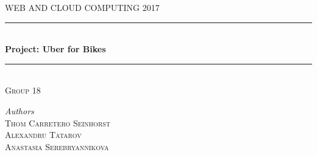 \begin{titlepage} %
	\newcommand{\HRule}{\rule{\linewidth}{0.5mm}} %
	
	\center %
	
	
	\textsc{\LARGE WEB AND CLOUD COMPUTING 2017}\\[1.5cm] %
	
	
	
	
	\HRule\\[0.4cm]
	
	{\huge\bfseries Project: Uber for Bikes}\\[0.4cm] %
	
	\HRule\\[1.5cm]
	
	\textsc{\large Group 18}\\[0.5cm] %
	
	\begin{minipage}{0.6\textwidth}
		\begin{center}
			\large
			\textit{Authors}\\
			\textsc{Thom Carretero Seinhorst} \\ %
			\textsc{Alexandru Tatarov} \\%
			\textsc{Anastasia Serebryannikova} %
		\end{center}
	\end{minipage}
	~
	
	
	

\end{titlepage}
